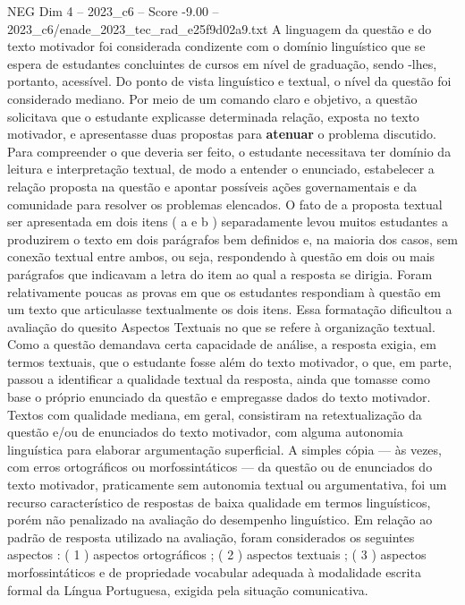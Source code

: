 \begin{textsample}{NEG Dim 4 – 2023\_c6 – Score -9.00 – 2023\_c6/enade\_2023\_tec\_rad\_e25f9d02a9.txt}
A linguagem da questão e do texto motivador foi considerada condizente com o domínio linguístico que se espera de estudantes concluintes de cursos em nível de graduação, sendo -lhes, portanto, acessível.
Do ponto de vista linguístico e textual, o nível da questão foi considerado mediano.
Por meio de um comando claro e objetivo, a questão solicitava que o estudante explicasse determinada relação, exposta no texto motivador, e apresentasse duas propostas para \textbf{atenuar} o problema discutido.
Para compreender o que deveria ser feito, o estudante necessitava ter domínio da leitura e interpretação textual, de modo a entender o enunciado, estabelecer a relação proposta na questão e apontar possíveis ações governamentais e da comunidade para resolver os problemas elencados.
O fato de a proposta textual ser apresentada em dois itens ( a e b ) separadamente levou muitos estudantes a produzirem o texto em dois parágrafos bem definidos e, na maioria dos casos, sem conexão textual entre ambos, ou seja, respondendo à questão em dois ou mais parágrafos que indicavam a letra do item ao qual a resposta se dirigia.
Foram relativamente poucas as provas em que os estudantes respondiam à questão em um texto que articulasse textualmente os dois itens.
Essa formatação dificultou a avaliação do quesito Aspectos Textuais no que se refere à organização textual.
Como a questão demandava certa capacidade de análise, a resposta exigia, em termos textuais, que o estudante fosse além do texto motivador, o que, em parte, passou a identificar a qualidade textual da resposta, ainda que tomasse como base o próprio enunciado da questão e empregasse dados do texto motivador.
Textos com qualidade mediana, em geral, consistiram na retextualização da questão e/ou de enunciados do texto motivador, com alguma autonomia linguística para elaborar argumentação superficial.
A simples cópia — às vezes, com erros ortográficos ou morfossintáticos — da questão ou de enunciados do texto motivador, praticamente sem autonomia textual ou argumentativa, foi um recurso característico de respostas de baixa qualidade em termos linguísticos, porém não penalizado na avaliação do desempenho linguístico.
Em relação ao padrão de resposta utilizado na avaliação, foram considerados os seguintes aspectos : ( 1 ) aspectos ortográficos ; ( 2 ) aspectos textuais ; ( 3 ) aspectos morfossintáticos e de propriedade vocabular adequada à modalidade escrita formal da Língua Portuguesa, exigida pela situação comunicativa.

\end{textsample}
